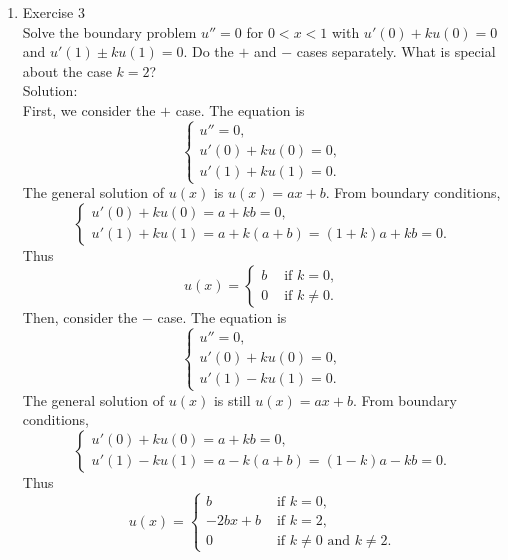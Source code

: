 \documentclass[12pt]{article}%
\begin{document}
\begin{enumerate}
\begin{enumerate}
        \item Exercise 3 \smallskip \\
        Solve the boundary problem $u'' = 0$ for $0 < x < 1$ with $u'\left(0\right) + ku\left(0\right) = 0$ and $u'\left(1\right) \pm ku\left(1\right) = 0$.  Do the $+$ and $-$ cases separately.  What is special about the case $k=2$? \\
        Solution: \\
      First, we consider the $+$ case. The equation is 
      \begin{equation*}
        \begin{cases}
            u'' = 0,
            \\
            u'\left(0\right) + ku\left(0\right) = 0,
            \\
            u'\left(1\right) + ku\left(1\right) = 0.
        \end{cases}
      \end{equation*}
    The general solution of $u(x)$ is $u(x)=ax+b$. From boundary conditions,
    \begin{equation*}
        \begin{cases}
            u'(0)+ku(0)=a+kb=0,
            \\
            u'(1)+ku(1)=a+k(a+b)=(1+k)a+kb=0.
        \end{cases}
    \end{equation*}
    Thus 
    $$
    u(x)=\begin{cases}
        b & \text{ if } k = 0, \\
        0 & \text{ if } k \ne 0.
      \end{cases}
   $$
   Then, consider the $-$ case. The equation is 
   \begin{equation*}
    \begin{cases}
        u'' = 0,
        \\
        u'\left(0\right) + ku\left(0\right) = 0,
        \\
        u'\left(1\right) - ku\left(1\right) = 0.
    \end{cases}
  \end{equation*}
  The general solution of $u(x)$ is still $u(x)=ax+b$. From boundary conditions,
    \begin{equation*}
        \begin{cases}
            u'(0)+ku(0)=a+kb=0,
            \\
            u'(1)-ku(1)=a-k(a+b)=(1-k)a-kb=0.
        \end{cases}
    \end{equation*}
    Thus $$
    u(x)=\begin{cases}
        b & \text{ if } k = 0, \\
        -2bx+b & \text{ if } k = 2, \\
        0 & \text{ if } k \ne 0 \text{ and } k \ne 2. 
      \end{cases}
   $$
        

\end{enumerate}
\end{enumerate}
\end{document}
